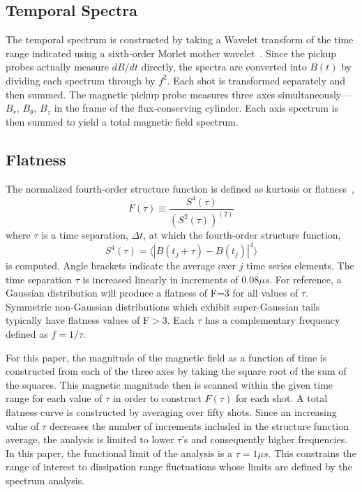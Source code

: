 \documentclass[aip,pop,amsmath,amssymb,preprint,superscriptaddress]{revtex4-1} %
\begin{document}
\subsection{Temporal Spectra}

The temporal spectrum is constructed by taking a Wavelet transform of the time range indicated using a sixth-order Morlet mother wavelet~\cite{brown2014}. Since the pickup probes actually measure $dB/dt$ directly, the spectra are converted into $B(t)$ by dividing each spectrum through by $f^2$. Each shot is transformed separately and then summed. The magnetic pickup probe measures three axes simultaneously---$B_{r}$, $B_{\theta}$, $B_{z}$ in the frame of the flux-conserving cylinder. Each axis spectrum is then summed to yield a total magnetic field spectrum.

\subsection{Flatness}
The normalized fourth-order structure function is defined as kurtosis or flatness~\cite{schaffner2015},
\begin{equation}
F(\tau) \equiv \frac{S^{4}(\tau)}{{(S^2(\tau))^{(2)}}}
\label{eq:structfunc}
\end{equation}
where $\tau$ is a time separation, $\Delta t$, at which the fourth-order structure function,
\begin{equation}
S^{4}(\tau) = \langle|B(t_{j}+\tau)-B(t_{j})|^{4}\rangle
\label{eq:structfunc2}
\end{equation}
is computed. Angle brackets indicate the average over $j$ time series elements. The time separation $\tau$ is increased linearly in increments of $0.08\mu s$. For reference, a Gaussian distribution will produce a flatness of F=3 for all values of $\tau$. Symmetric non-Gaussian distributions which exhibit super-Gaussian tails typically have flatness values of F$>$3. Each $\tau$ has a complementary frequency defined as $f = 1/\tau$. 

For this paper, the magnitude of the magnetic field as a function of time is constructed from each of the three axes by taking the square root of the sum of the squares. This magnetic magnitude then is scanned within the given time range for each value of $\tau$ in order to construct $F(\tau)$ for each shot. A total flatness curve is constructed by averaging over fifty shots. Since an increasing value of $\tau$ decreases the number of increments included in the structure function average, the analysis is limited to lower $\tau$'s and consequently higher frequencies. In this paper, the functional limit of the analysis is a $\tau = 1\mu s$. This constrains the range of interest to dissipation range fluctuations whose limits are defined by the spectrum analysis.
\end{document}
